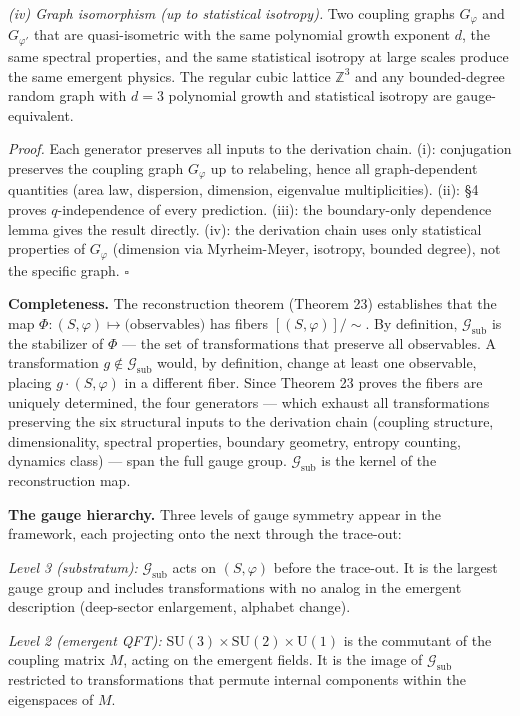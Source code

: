 \documentclass[
  11pt,
]{article}
\begin{document}
\emph{(iv) Graph isomorphism (up to statistical isotropy).} Two coupling
graphs \(G_\varphi\) and \(G_{\varphi'}\) that are quasi-isometric with
the same polynomial growth exponent \(d\), the same spectral properties,
and the same statistical isotropy at large scales produce the same
emergent physics. The regular cubic lattice \(\mathbb{Z}^3\) and any
bounded-degree random graph with \(d = 3\) polynomial growth and
statistical isotropy are gauge-equivalent.

\emph{Proof.} Each generator preserves all inputs to the derivation
chain. (i): conjugation preserves the coupling graph \(G_\varphi\) up to
relabeling, hence all graph-dependent quantities (area law, dispersion,
dimension, eigenvalue multiplicities). (ii): §4 proves
\(q\)-independence of every prediction. (iii): the boundary-only
dependence lemma gives the result directly. (iv): the derivation chain
uses only statistical properties of \(G_\varphi\) (dimension via
Myrheim-Meyer, isotropy, bounded degree), not the specific graph.
\(\square\)

\textbf{Completeness.} The reconstruction theorem (Theorem 23)
establishes that the map
\(\Phi: (S, \varphi) \mapsto \text{(observables)}\) has fibers
\([(S, \varphi)]/\!\sim\). By definition, \(\mathcal{G}_{\text{sub}}\)
is the stabilizer of \(\Phi\) --- the set of transformations that
preserve all observables. A transformation
\(g \notin \mathcal{G}_{\text{sub}}\) would, by definition, change at
least one observable, placing \(g \cdot (S, \varphi)\) in a different
fiber. Since Theorem 23 proves the fibers are uniquely determined, the
four generators --- which exhaust all transformations preserving the six
structural inputs to the derivation chain (coupling structure,
dimensionality, spectral properties, boundary geometry, entropy
counting, dynamics class) --- span the full gauge group.
\(\mathcal{G}_{\text{sub}}\) is the kernel of the reconstruction map.

\textbf{The gauge hierarchy.} Three levels of gauge symmetry appear in
the framework, each projecting onto the next through the trace-out:

\emph{Level 3 (substratum):} \(\mathcal{G}_{\text{sub}}\) acts on
\((S, \varphi)\) before the trace-out. It is the largest gauge group and
includes transformations with no analog in the emergent description
(deep-sector enlargement, alphabet change).

\emph{Level 2 (emergent QFT):}
\(\text{SU}(3) \times \text{SU}(2) \times \text{U}(1)\) is the commutant
of the coupling matrix \(M\), acting on the emergent fields. It is the
image of \(\mathcal{G}_{\text{sub}}\) restricted to transformations that
permute internal components within the eigenspaces of \(M\).
\end{document}

